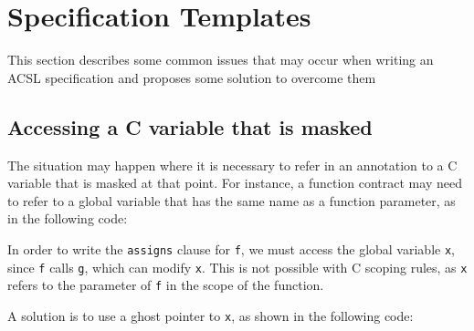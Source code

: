 \section{Specification Templates}\label{sec:spec-templ}
This section describes some common issues that may occur when writing
an ACSL specification and proposes some solution to overcome them

\subsection{Accessing a C variable that is masked}

The situation may happen where it is necessary to refer
in an annotation to a C variable that is masked at that point.
For instance,
a function contract may need to refer to a global variable that has the
same name as a function parameter, as in the following code:


In order to write the \verb|assigns| clause for \verb|f|, we must
access the global variable \verb|x|, since \verb|f| calls \verb|g|,
which can modify \verb|x|. This is not possible with C scoping rules,
as \verb|x| refers to the parameter of \verb|f| in the scope of the
function.

A solution is to use a ghost pointer to \verb|x|, as shown in
the following code:



